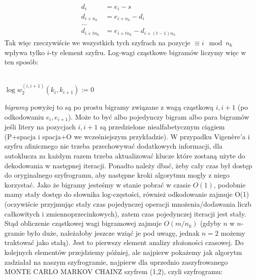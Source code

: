 \documentclass[a4paper]{article}
\theoremstyle{defn}
\theoremstyle{theorem}
\theoremstyle{lemma}
\theoremstyle{cor}
\theoremstyle{fact}
\begin{document}
\begin{align*}
    d_i &= e_i - s\\
    d_{i+n_k} &= e_{i+n_k} - d_i\\
    ...\\
    d_{i+tn_k} &= e_{i+tn_k} - d_{i+(t-1)n_k}
\end{align*}
Tak więc rzeczywiście we wszystkich tych szyfrach na pozycje $\equiv i \mod n_k$ wpływa tylko $i$-ty element szyfru. Log-wagi cząstkowe bigramów liczymy więc w ten sposób:\\\\
\begin{algorithm}[H]
$\log w_2^{(i,i+1)}(k_i, k_{i+1}) := 0$\;
\end{algorithm}
\textit{bigramy} powyżej to są po prostu bigramy związane z wagą cząstkową $i,i+1$ (po odkodowaniu $e_i, e_{i+1}$). Może to być albo pojedynczy bigram albo para bigramów jeśli litery na pozycjach $i, i+1$ są przedzielone niealfabetycznym ciągiem (P+spacja i spacja+O we wcześniejszym przykładzie). W przypadku Vigenère'a i szyfru afinicznego nie trzeba przechowywać dodatkowych informacji, dla autoklucza za każdym razem trzeba aktualizować klucze które zostaną użyte do dekodowania w następnej iteracji. Ponadto należy dbać, żeby cały czas był dostęp do oryginalnego szyfrogramu, aby następne kroki algorytmu mogły z niego korzystać. Jako że bigramy jesteśmy w stanie pobrać w czasie $O(1)$, podobnie mamy stały dostęp do słownika log-częstości, również odkodowanie zajmuje O(1) (oczywiście przyjmując stały czas pojedynczej operacji mnożenia/dodawania liczb całkowitych i zmiennoprzecinkowych), zatem czas pojedynczej iteracji jest stały. Stąd obliczenie cząstkowej wagi bigramowej zajmuje $O(m/n_k)$ (gdyby $n$ w $n$-gramie było duże, należałoby jeszcze wziąć je pod uwagę, jednak $n=2$ możemy traktować jako stałą). Jest to pierwszy element analizy złożoności czasowej. Do kolejnych elementów przejdziemy później, ale najpierw pokażemy jak algorytm zadziałał na naszym szyfrogramie, najpierw dla uprzednio zaszyfrowanego MONTE CARLO MARKOV CHAINZ szyfrem (1,2), czyli szyfrogramu:
\end{document}
